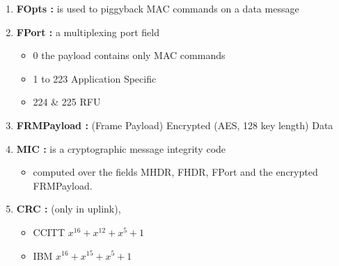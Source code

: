 \begin{landscape}
\begin{multicols}{2}
\begin{enumerate}
	\item \textbf{FOpts :} is used to piggyback MAC commands on a data message	
	\item \textbf{FPort :}  a multiplexing port field
	\begin{itemize}
		\item 0  the payload contains only MAC commands
		 \item 1 to 223  Application Specific
		 \item 224 \& 225  RFU
	\end{itemize}
    \item \textbf{FRMPayload :} (Frame Payload)  Encrypted (AES, 128 key length) Data                                 
	\item \textbf{MIC :}  is a cryptographic message integrity code
	\begin{itemize}
		\item computed over the fields MHDR, FHDR, FPort and the encrypted FRMPayload.
	\end{itemize}
	\item \textbf{CRC :} (only in uplink), 
	\begin{itemize}
		\item CCITT  $x^{16} + x^{12} + x^{5} + 1$
		\item IBM  $x^{16} + x^{15} + x^{5} + 1$
	\end{itemize}
\end{enumerate}

\end{multicols}


\end{landscape}


